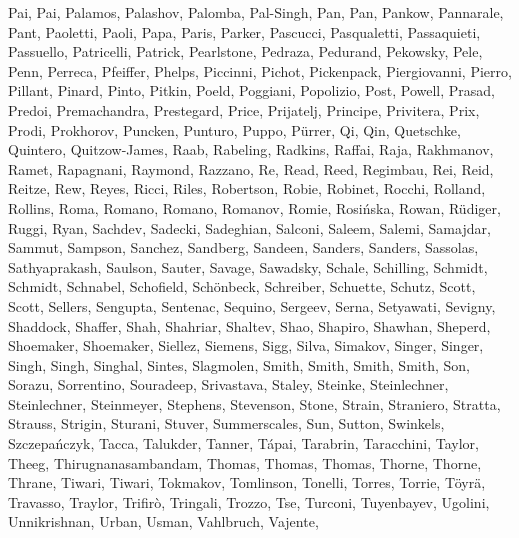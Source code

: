 \documentclass[times,tight]{aastex631}
\begin{document}
\begin{thebibliography}{}
{  {Pai}, {Pai}, {Palamos}, {Palashov}, {Palomba}, {Pal-Singh}, {Pan}, {Pan},
  {Pankow}, {Pannarale}, {Pant}, {Paoletti}, {Paoli}, {Papa}, {Paris},
  {Parker}, {Pascucci}, {Pasqualetti}, {Passaquieti}, {Passuello},
  {Patricelli}, {Patrick}, {Pearlstone}, {Pedraza}, {Pedurand}, {Pekowsky},
  {Pele}, {Penn}, {Perreca}, {Pfeiffer}, {Phelps}, {Piccinni}, {Pichot},
  {Pickenpack}, {Piergiovanni}, {Pierro}, {Pillant}, {Pinard}, {Pinto},
  {Pitkin}, {Poeld}, {Poggiani}, {Popolizio}, {Post}, {Powell}, {Prasad},
  {Predoi}, {Premachandra}, {Prestegard}, {Price}, {Prijatelj}, {Principe},
  {Privitera}, {Prix}, {Prodi}, {Prokhorov}, {Puncken}, {Punturo}, {Puppo},
  {P{\"u}rrer}, {Qi}, {Qin}, {Quetschke}, {Quintero}, {Quitzow-James}, {Raab},
  {Rabeling}, {Radkins}, {Raffai}, {Raja}, {Rakhmanov}, {Ramet}, {Rapagnani},
  {Raymond}, {Razzano}, {Re}, {Read}, {Reed}, {Regimbau}, {Rei}, {Reid},
  {Reitze}, {Rew}, {Reyes}, {Ricci}, {Riles}, {Robertson}, {Robie}, {Robinet},
  {Rocchi}, {Rolland}, {Rollins}, {Roma}, {Romano}, {Romano}, {Romanov},
  {Romie}, {Rosi{\'n}ska}, {Rowan}, {R{\"u}diger}, {Ruggi}, {Ryan}, {Sachdev},
  {Sadecki}, {Sadeghian}, {Salconi}, {Saleem}, {Salemi}, {Samajdar}, {Sammut},
  {Sampson}, {Sanchez}, {Sandberg}, {Sandeen}, {Sanders}, {Sanders},
  {Sassolas}, {Sathyaprakash}, {Saulson}, {Sauter}, {Savage}, {Sawadsky},
  {Schale}, {Schilling}, {Schmidt}, {Schmidt}, {Schnabel}, {Schofield},
  {Sch{\"o}nbeck}, {Schreiber}, {Schuette}, {Schutz}, {Scott}, {Scott},
  {Sellers}, {Sengupta}, {Sentenac}, {Sequino}, {Sergeev}, {Serna},
  {Setyawati}, {Sevigny}, {Shaddock}, {Shaffer}, {Shah}, {Shahriar}, {Shaltev},
  {Shao}, {Shapiro}, {Shawhan}, {Sheperd}, {Shoemaker}, {Shoemaker}, {Siellez},
  {Siemens}, {Sigg}, {Silva}, {Simakov}, {Singer}, {Singer}, {Singh}, {Singh},
  {Singhal}, {Sintes}, {Slagmolen}, {Smith}, {Smith}, {Smith}, {Smith}, {Son},
  {Sorazu}, {Sorrentino}, {Souradeep}, {Srivastava}, {Staley}, {Steinke},
  {Steinlechner}, {Steinlechner}, {Steinmeyer}, {Stephens}, {Stevenson},
  {Stone}, {Strain}, {Straniero}, {Stratta}, {Strauss}, {Strigin}, {Sturani},
  {Stuver}, {Summerscales}, {Sun}, {Sutton}, {Swinkels}, {Szczepa{\'n}czyk},
  {Tacca}, {Talukder}, {Tanner}, {T{\'a}pai}, {Tarabrin}, {Taracchini},
  {Taylor}, {Theeg}, {Thirugnanasambandam}, {Thomas}, {Thomas}, {Thomas},
  {Thorne}, {Thorne}, {Thrane}, {Tiwari}, {Tiwari}, {Tokmakov}, {Tomlinson},
  {Tonelli}, {Torres}, {Torrie}, {T{\"o}yr{\"a}}, {Travasso}, {Traylor},
  {Trifir{\`o}}, {Tringali}, {Trozzo}, {Tse}, {Turconi}, {Tuyenbayev},
  {Ugolini}, {Unnikrishnan}, {Urban}, {Usman}, {Vahlbruch}, {Vajente},
}
\end{thebibliography}
\end{document}
